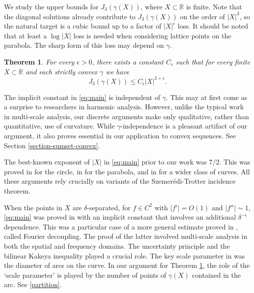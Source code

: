 \documentclass{amsart}
\numberwithin{equation}{section}
\newtheorem{theorem}{Theorem}[section]
\newcommand{\e}{\epsilon}
\newcommand{\ZR}{\mathbb{R}}
\begin{document}
\medskip 

We study the upper bounds for $J_3(\gamma(X))$, where $X\subset\ZR$ is finite.
Note that the diagonal solutions already contribute to $J_3(\gamma(X))$ on the order of $|X|^3$, so the natural target is a cubic bound up to a factor of $|X|^\epsilon$ loss. 
It should be noted that at least a $\log |X|$ loss is needed when considering lattice points on the parabola. 
The sharp form of this loss may depend on $\gamma$.

\begin{theorem}
    \label{thm:main}
    For every $\epsilon>0$, there exists a constant $C_\e$  such that 
    for every finite $X\subset \ZR$ and each strictly convex $\gamma$ we have
    \begin{equation}
    \label{eq:main}
        J_3(\gamma(X))\leq C_\e|X|^{3+\epsilon}.
    \end{equation}
\end{theorem}
The implicit constant in \eqref{eq:main} is independent of $\gamma$. 
This may at first come as a surprise to researchers in harmonic analysis. 
However, unlike the typical work in multi-scale analysis, our discrete arguments make only qualitative, rather than quantitative, use of curvature. 
While $\gamma$-independence is a pleasant artifact of our argument, it also proves essential in our application to convex sequences.  
See Section \ref{section-sumset-convex}.

The best-known exponent of $|X|$ in \eqref{eq:main} prior to our work was $7/2$. This was proved in \cite{Bombieri-Bourgain} for the circle, in \cite{Bourgain-Demeter} for the parabola, and in \cite{Mudgal} for a wider class of curves. All these arguments rely crucially on variants of the  Szemer\'edi-Trotter incidence theorem.

\medskip 


When the points in $X$ are $\delta$-separated, for $f\in C^2$ with $|f'|=O(1)$ and $|f''|\sim1$, \eqref{eq:main} was proved in \cite{Bourgain-Demeter} with an implicit constant that involves an additional $\delta^{-\e}$ dependence. 
This was a particular case of a more general estimate proved in \cite{Bourgain-Demeter}, called Fourier decoupling. 
The proof of the latter involved multi-scale analysis in both the spatial and frequency domains. 
The uncertainty principle and the bilinear Kakeya inequality played a crucial role. 
The key scale parameter in \cite{Bourgain-Demeter} was the diameter of arcs on the curve. 
In our argument for Theorem \ref{thm:main}, the role of the `scale parameter' is played by the number of points of $\gamma(X)$ contained in the arc. 
See \eqref{partition}.     
\end{document}
